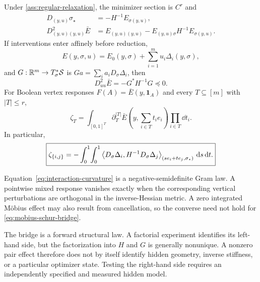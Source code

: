\begin{theorem}
\label{thm:reduction-induced-interaction}
Under \cref{ass:regular-relaxation}, the minimizer section is $C^r$ and
\begin{align}
D_{(y,u)}\sigma_\star
&=-H^{-1}E_{\sigma(y,u)},
\label{eq:hidden-response-law}\\
D^2_{(y,u)(y,u)}\bar E
&=E_{(y,u)(y,u)}-E_{(y,u)\sigma}H^{-1}E_{\sigma(y,u)}.
\label{eq:effective-schur-hessian}
\end{align}
If interventions enter affinely before reduction,
\begin{equation}
E(y,\sigma,u)=E_0(y,\sigma)+\sum_{i=1}^m u_i\Delta_i(y,\sigma),
\label{eq:affine-interventions}
\end{equation}
and $G:\mathbb R^m\to T_\sigma^*\mathcal S$ is $Ga=\sum_i a_iD_\sigma\Delta_i$, then
\begin{equation}
\boxed{D^2_{uu}\bar E=-G^*H^{-1}G\preceq0.}
\label{eq:interaction-curvature}
\end{equation}
For Boolean vertex responses $F(A)=\bar E(y,\mathbf1_A)$ and every $T\subseteq[m]$ with $|T|\le r$,
\begin{equation}
\zeta_T
=\int_{[0,1]^T}
\partial_T^{|T|}\bar E
\left(y,\sum_{i\in T}t_ie_i\right)
\prod_{i\in T}\dd t_i.
\label{eq:mobius-derivative-integral}
\end{equation}
In particular,
\begin{equation}
\boxed{
\zeta_{\{i,j\}}
=-\int_0^1\!\int_0^1
\left\langle D_\sigma\Delta_i,H^{-1}D_\sigma\Delta_j\right\rangle_{(se_i+te_j,\sigma_\star)}
\,\mathrm d s\,\mathrm d t.}
\label{eq:mobius-schur-bridge}
\end{equation}
\end{theorem}

Equation~\eqref{eq:interaction-curvature} is a negative-semidefinite Gram law.  A pointwise mixed response vanishes exactly when the corresponding vertical perturbations are orthogonal in the inverse-Hessian metric.  A zero integrated M\"obius effect may also result from cancellation, so the converse need not hold for \eqref{eq:mobius-schur-bridge}.

The bridge is a forward structural law.  A factorial experiment identifies its left-hand side, but the factorization into $H$ and $G$ is generally nonunique.  A nonzero pair effect therefore does not by itself identify hidden geometry, inverse stiffness, or a particular optimizer state.  Testing the right-hand side requires an independently specified and measured hidden model.

